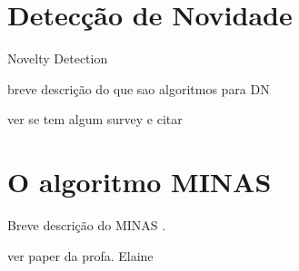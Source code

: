 




\section{Detecção de Novidade}

Novelty Detection

breve descrição do que sao algoritmos para DN

ver se tem algum survey e citar

\section{O algoritmo MINAS}

Breve descrição do MINAS \cite{Faria2016minas}.

ver paper da profa. Elaine

